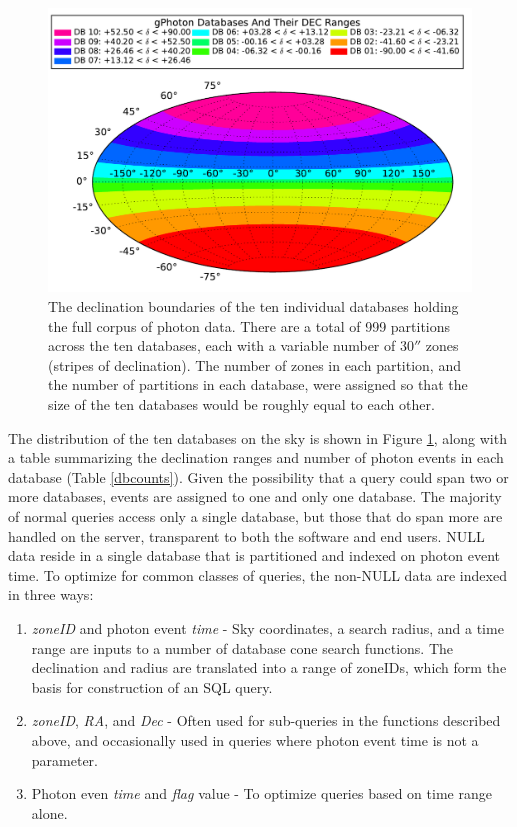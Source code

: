 \documentclass[preprint]{aastex}
\begin{document}
\begin{figure}[h]
\includegraphics[scale=0.9]{Fig01.pdf}
\caption{The declination boundaries of the ten individual databases holding the full corpus of photon data. There are a total of 999 partitions across the ten databases, each with a variable number of $30''$ zones (stripes of declination).  The number of zones in each partition, and the number of partitions in each database, were assigned so that the size of the ten databases would be roughly equal to each other. \label{dbdist}}
\end{figure}

The distribution of the ten databases on the sky is shown in Figure \ref{dbdist}, along with a table summarizing the declination ranges and number of photon events in each database (Table \ref{dbcounts}). Given the possibility that a query could span two or more databases, events are assigned to one and only one database. The majority of normal queries access only a single database, but those that do span more are handled on the server, transparent to both the software and end users.
	NULL data reside in a single database that is partitioned and indexed on photon event time. To optimize for common classes of queries, the non-NULL data are indexed in three ways:
\begin{enumerate}
	\item{\emph{zoneID} and photon event \emph{time} - Sky coordinates, a search radius, and a time range are inputs to a number of database cone search functions. The declination and radius are translated into a range of zoneIDs, which form the basis for construction of an SQL query.}
	\item{\emph{zoneID}, \emph{RA}, and \emph{Dec} - Often used for sub-queries in the functions described above, and occasionally used in queries where photon event time is not a parameter.}
	\item{Photon even \emph{time} and \emph{flag} value - To optimize queries based on time range alone.}
\end{enumerate}
\end{document}
